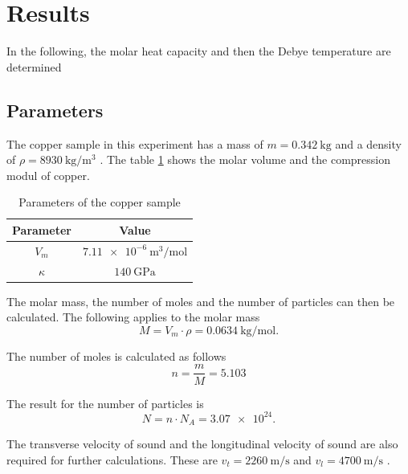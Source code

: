 \section{Results}
\label{sec:results}

In the following, the molar heat capacity and then the Debye temperature are determined

\subsection{Parameters}
\label{sec:parameters}

The copper sample in this experiment has a mass of $m = \qty{0.342}{\kilo\gram}$ \textnormal{\cite{molar_heat}} and a density of
$ \rho = \qty{8930}{\kilo\gram \per \meter^3 }$ \textnormal{\cite{kupfer}}.
The table \ref{tab:parameters} shows the molar volume and the compression modul of copper.
\begin{table}[H]
	\centering
	\caption{Parameters of the copper sample}
	\label{tab:parameters}
	\begin{tabular}{c c }
		\toprule
		Parameter & Value \\
		\midrule
		$V_m$ & $\qty{7.11e-6}{\meter^3 \per \mol}$ \cite{chemie_kupfer}\\
		$\kappa$ & $\qty{140} {\giga\pascal}$ \cite{perioden_kupfer}\\
		\bottomrule
	\end{tabular}
\end{table}

The molar mass, the number of moles and the number of particles can then be calculated.
The following applies to the molar mass
\begin{equation*}
	M = V_m \cdot \rho = \qty{0.0634}{\kilo\gram \per \mol}.
\end{equation*}

The number of moles is calculated as follows
\begin{equation*}
	n = \frac{m}{M} = \num{5.103}
\end{equation*}

The result for the number of particles is
\begin{equation*}
	N = n \cdot N_A = \num{3.07e24}.
\end{equation*}

The transverse velocity of sound and the longitudinal velocity of sound are also required for further calculations.
These are $v_t = \qty{2260}{\meter \per \second}$ and $v_l = \qty{4700}{\meter \per \second}$ \cite{molar_heat}.

